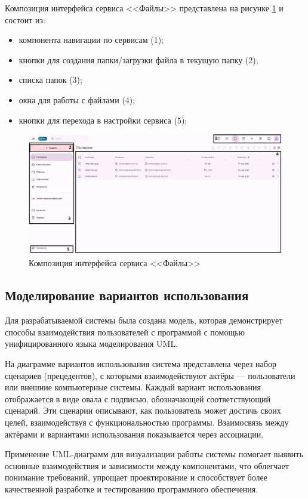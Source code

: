 Композиция интерфейса сервиса <<Файлы>> представлена на рисунке \ref{templ:image9} и состоит из:
\begin{itemize}
  \item компонента навигации по сервисам (1);
  \item кнопки для создания папки/загрузки файла в текущую папку (2);
  \item списка папок (3);
  \item окна для работы с файлами (4);
  \item кнопки для перехода в настройки сервиса (5);
\end{itemize}
\begin{figure}[H]
	\centering
	\includegraphics[width=1\linewidth]{images/файлы}
	\caption{Композиция интерфейса сервиса <<Файлы>>}
	\label{templ:image9}
\end{figure}

\clearpage
\subsection{Моделирование вариантов использования}

Для разрабатываемой системы была создана модель, которая демонстрирует способы взаимодействия пользователей с программой с помощью унифицированного языка моделирования UML.

На диаграмме вариантов использования система представлена через набор сценариев (прецедентов), с которыми взаимодействуют актёры — пользователи или внешние компьютерные системы. Каждый вариант использования отображается в виде овала с подписью, обозначающей соответствующий сценарий. Эти сценарии описывают, как пользователь может достичь своих целей, взаимодействуя с функциональностью программы. Взаимосвязь между актёрами и вариантами использования показывается через ассоциации.

Применение UML-диаграмм для визуализации работы системы помогает выявить основные взаимодействия и зависимости между компонентами, что облегчает понимание требований, упрощает проектирование и способствует более качественной разработке и тестированию программного обеспечения.

